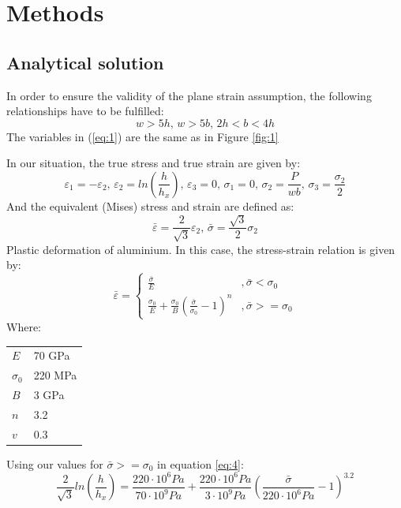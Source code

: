 \documentclass[12pt]{article}
\makeatletter
\newenvironment{conditions}
  {\par\vspace{\abovedisplayskip}\noindent\begin{tabular}{>{$}l<{$} @{${}={}$} l}}
  {\end{tabular}\par\vspace{\belowdisplayskip}}
\makeatother
\begin{document}
\section{Methods}

\subsection{Analytical solution}
In order to ensure the validity of the plane strain assumption, the following relationships have to
be fulfilled:
\begin{equation}\label{eq:1}
  w > 5h, \, w > 5b,\, 2h < b < 4h
\end{equation}
The variables in (\ref{eq:1}) are the same as in Figure \ref{fig:1}

In our situation, the true stress and true strain are given by:
\begin{equation}\label{eq:2}
  \varepsilon_{1}=-\varepsilon_{2},\,\varepsilon_{2}=ln(\frac{h}{h_{x}}),\,\varepsilon_{3}=0,\,
  \sigma_{1}=0,\,\sigma_{2}=\frac{P}{wb},\,\sigma_{3}=\frac{\sigma_{2}}{2}
\end{equation}
And the equivalent (Mises) stress and strain are defined as:
\begin{equation}\label{eq:3}
  \bar{\varepsilon}=\frac{2}{\sqrt{3}}\varepsilon_{2},\,\bar{\sigma}=\frac{\sqrt{3}}{2}\sigma_{2}
\end{equation}
Plastic deformation of aluminium. In this case, the stress-strain relation is given by:
\begin{equation}\label{eq:4}
  \bar{\varepsilon} = 
  \begin{cases} 
    \frac{\bar{\sigma}}{E} & ,\bar{\sigma} < \sigma_{0} \\
    \frac{\sigma_{0}}{E}+\frac{\sigma_{0}}{B}(\frac{\bar{\sigma}}{\sigma_{0}}-1)^{n} & ,\bar{\sigma} >= \sigma_{0}
  \end{cases}
\end{equation}
Where:
\begin{conditions}
  E           & 70 GPa \\
  \sigma_{0}  & 220 MPa \\   
  B           & 3 GPa \\
  n           & 3.2 \\
  v           & 0.3
\end{conditions}
\noindent Using our values for $\bar{\sigma} >= \sigma_{0}$ in equation \ref{eq:4}:
\begin{equation}
  \frac{2}{\sqrt{3}}ln(\frac{h}{h_{x}}) = \frac{220 \cdot 10^6 Pa}{70 \cdot 10^9 Pa}+\frac{220 \cdot 10^6 Pa}{3 \cdot 10^9 Pa}(\frac{\bar{\sigma}}{220 \cdot 10^6 Pa}-1)^{3.2}
\end{equation}
\newpage
\end{document}
